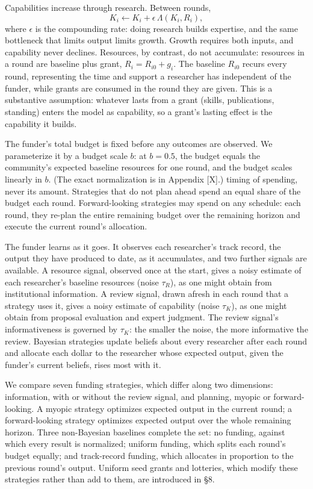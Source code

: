 \documentclass[article, 11pt, reqno]{amsart}
\theoremstyle{named}
\begin{document}
Capabilities increase through research. Between rounds,
\[
K_i \leftarrow K_i + \epsilon\,\Lambda(K_i, R_i),
\]
where $\epsilon$ is the compounding rate: doing research builds expertise, and the same bottleneck that limits output limits growth. Growth requires both inputs, and capability never declines. Resources, by contrast, do not accumulate: resources in a round are baseline plus grant, $R_i = R_{i0} + g_i$. The baseline $R_{i0}$ recurs every round, representing the time and support a researcher has independent of the funder, while grants are consumed in the round they are given. This is a substantive assumption: whatever lasts from a grant (skills, publications, standing) enters the model as capability, so a grant's lasting effect is the capability it builds.

The funder's total budget is fixed before any outcomes are observed. We parameterize it by a budget scale $b$: at $b = 0.5$, the budget equals the community's expected baseline resources for one round, and the budget scales linearly in $b$. (The exact normalization is in Appendix [X].) %
timing of spending, never its amount. Strategies that do not plan ahead spend an equal share of the budget each round. Forward-looking strategies may spend on any schedule: each round, they re-plan the entire remaining budget over the remaining horizon and execute the current round's allocation.

The funder learns as it goes. It observes each researcher's track record, the output they have produced to date, as it accumulates, and two further signals are available. A resource signal, observed once at the start, gives a noisy estimate of each researcher's baseline resources (noise $\tau_R$), as one might obtain from institutional information. A review signal, drawn afresh in each round that a strategy uses it, gives a noisy estimate of capability (noise $\tau_K$), as one might obtain from proposal evaluation and expert judgment. The review signal's informativeness is governed by $\tau_K$: the smaller the noise, the more informative the review. Bayesian strategies update beliefs about every researcher after each round and allocate each dollar to the researcher whose expected output, given the funder's current beliefs, rises most with it.

We compare seven funding strategies, which differ along two dimensions: information, with or without the review signal, and planning, myopic or forward-looking. A myopic strategy optimizes expected output in the current round; a forward-looking strategy optimizes expected output over the whole remaining horizon. Three non-Bayesian baselines complete the set: no funding, against which every result is normalized; uniform funding, which splits each round's budget equally; and track-record funding, which allocates in proportion to the previous round's output. Uniform seed grants and lotteries, which modify these strategies rather than add to them, are introduced in \S8.
\end{document}
